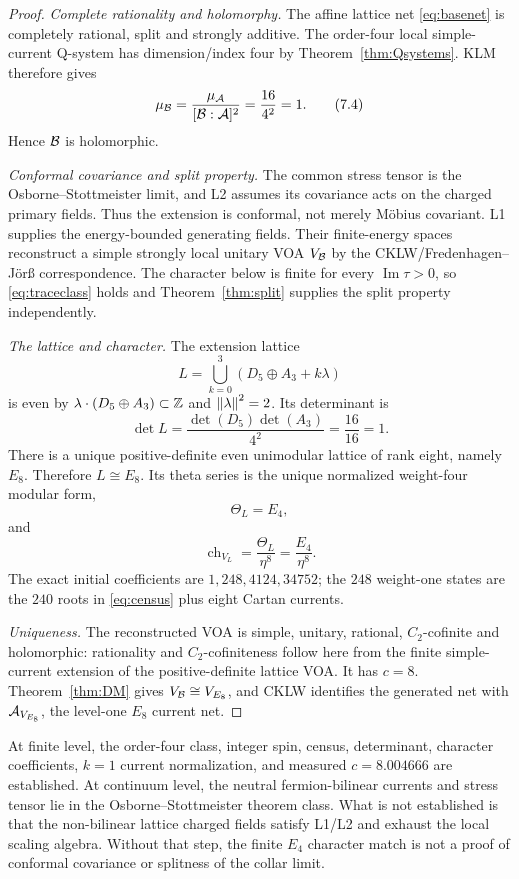 \begin{proof}
\emph{Complete rationality and holomorphy.}
The affine lattice net \eqref{eq:basenet} is completely rational, split
and strongly additive.  The order-four local simple-current Q-system has
dimension/index four by Theorem~\ref{thm:Qsystems}.  KLM therefore gives
\[
 \mu_\mathcal B=\frac{\mu_\mathcal A}{[\mathcal B:\mathcal A]^2}
 =\frac{16}{4^2}=1.
\tag{7.4}\label{eq:muone}
\]
Hence $\mathcal B$ is holomorphic.

\emph{Conformal covariance and split property.}
The common stress tensor is the Osborne--Stottmeister limit, and L2
assumes its covariance acts on the charged primary fields.  Thus the
extension is conformal, not merely M\"obius covariant.  L1 supplies the
energy-bounded generating fields.  Their finite-energy spaces reconstruct
a simple strongly local unitary VOA $V_\mathcal B$ by the CKLW/Fredenhagen--J\"or{\ss}
correspondence.  The character below is finite for every
$\operatorname{Im}\tau>0$, so \eqref{eq:traceclass} holds and
Theorem~\ref{thm:split} supplies the split property independently.

\emph{The lattice and character.}
The extension lattice
\[
 L=\bigcup_{k=0}^3(D_5\oplus A_3+k\lambda)
\tag{7.5}\label{eq:gluedlattice}
\]
is even by $\lambda\cdot(D_5\oplus A_3)\subset\mathbb Z$ and
$\left\lVert\lambda\right\rVert^2=2$.  Its determinant is
\[
 \det L=\frac{\det(D_5)\det(A_3)}{4^2}
 =\frac{16}{16}=1.
\tag{7.6}\label{eq:unimodular}
\]
There is a unique positive-definite even unimodular lattice of rank
eight, namely $E_8$.  Therefore $L\cong E_8$.
Its theta series is the unique normalized weight-four modular form,
\[
 \Theta_L=E_4,
\tag{7.7}\label{eq:thetaE4}
\]
and
\[
 \operatorname{ch}_{V_L}
 =\frac{\Theta_L}{\eta^8}
 =\frac{E_4}{\eta^8}.
\tag{7.8}\label{eq:character}
\]
The exact initial coefficients are
$1,248,4124,34752$; the $248$ weight-one states are the $240$ roots in
\eqref{eq:census} plus eight Cartan currents.

\emph{Uniqueness.}
The reconstructed VOA is simple, unitary, rational, $C_2$-cofinite and
holomorphic: rationality and $C_2$-cofiniteness follow here from the
finite simple-current extension of the positive-definite lattice VOA.
It has $c=8$.  Theorem~\ref{thm:DM} gives
$V_\mathcal B\cong V_{E_8}$, and CKLW identifies the generated net with
$\mathcal A_{V_{E_8}}$, the level-one $E_8$ current net.
\end{proof}

\begin{remark}
At finite level, the order-four class, integer spin, census, determinant,
character coefficients, $k=1$ current normalization, and measured
$c=8.004666$ are established.  At continuum level, the neutral
fermion-bilinear currents and stress tensor lie in the
Osborne--Stottmeister theorem class.  What is not established is that the
non-bilinear lattice charged fields satisfy L1/L2 and exhaust the local
scaling algebra.  Without that step, the finite $E_4$ character match is
not a proof of conformal covariance or splitness of the collar limit.
\end{remark}

